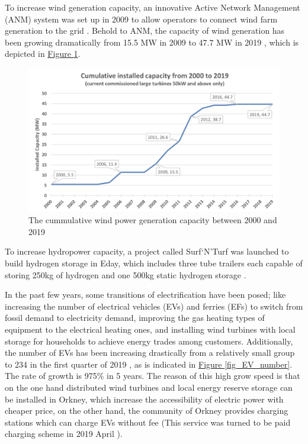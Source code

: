 \documentclass[12pt,a4paper]{report}
\begin{document}
        To increase wind generation capacity, an innovative Active Network Management (ANM) system was set up in 2009 to allow operators to connect wind farm generation to the grid \cite{website:ANM}. 
        Behold to ANM, the capacity of wind generation has been growing dramatically from 15.5 MW in 2009 to 47.7 MW in 2019 \cite{report:OrkneyAudit}, which is depicted in \hyperref[fig_cummulative_wind_capacity]{Figure \ref*{fig_cummulative_wind_capacity}}. 
        
        \begin{figure}[ht]
            \centerline{\includegraphics[scale=1]{cummulativewindcapacity}}
            \caption{The cummulative wind power generation capacity between 2000 and 2019}
            \label{fig_cummulative_wind_capacity}
        \end{figure}

        To increase hydropower capacity, a project called Surf`N'Turf was launched to build hydrogen storage in Eday, 
        which includes three tube trailers each capable of storing 250kg of hydrogen and one 500kg static hydrogen storage \cite{website:surfturf}. 

        In the past few years, some transitions of electrification have been posed; 
        like increasing the number of electrical vehicles (EVs) and ferries (EFs) to switch 
        from fossil demand to electricity demand, improving the gas heating types of 
        equipment to the electrical heating ones, and installing wind turbines with local 
        storage for households to achieve energy trades among customers. 
        Additionally, the number of EVs has been increasing drastically from a relatively small group to 234 in the first quarter of 2019 \cite{report:OrkneyAudit}, as is indicated in \hyperref[fig_EV_number]{Figure \ref*{fig_EV_number}}.
        The rate of growth is 975\% in 5 years. The reason of this high grow speed is that on the one hand distributed wind turbines and local energy reserve storage can be installed in Orkney, which increase the accessibility of electric power with cheaper price, on the other hand, the community of Orkney provides charging stations which can charge EVs without fee (This service was turned to be paid charging scheme in 2019 April \cite{report:OrkneyAudit}).
\end{document}
